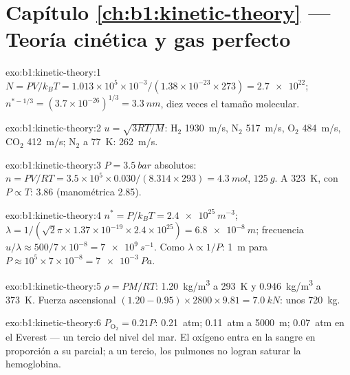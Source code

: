 \section*{Capítulo \ref{ch:b1:kinetic-theory} --- Teoría cinética y gas perfecto}

\begin{solution}{exo:b1:kinetic-theory:1}
$N = PV/k_BT = 1.013\times10^5 \times 10^{-3}/(1.38\times10^{-23} \times 273) =
\num{2.7e22}$; $n^{*-1/3} = (3.7\times10^{-26})^{1/3} = \qty{3.3}{nm}$, diez
veces el tamaño molecular.
\end{solution}

\begin{solution}{exo:b1:kinetic-theory:2}
$u = \sqrt{3RT/M}$: H$_2$ \qty{1930}{m/s}, N$_2$ \qty{517}{m/s}, O$_2$
\qty{484}{m/s}, CO$_2$ \qty{412}{m/s}; N$_2$ a \qty{77}{K}: \qty{262}{m/s}.
\end{solution}

\begin{solution}{exo:b1:kinetic-theory:3}
$P = \qty{3.5}{bar}$ absolutos: $n = PV/RT = 3.5\times10^5 \times 0.030/(8.314
\times 293) = \qty{4.3}{mol}$, $\qty{125}{g}$. A \qty{323}{K}, con $P \propto T$:
\qty{3.86}{} (manométrica \qty{2.85}{}).
\end{solution}

\begin{solution}{exo:b1:kinetic-theory:4}
$n^* = P/k_BT = \qty{2.4e25}{m^{-3}}$; $\lambda = 1/(\sqrt2\pi \times 1.37\times
10^{-19} \times 2.4\times10^{25}) = \qty{6.8e-8}{m}$; frecuencia $u/\lambda \approx
500/7\times10^{-8} = \qty{7e9}{s^{-1}}$. Como $\lambda \propto 1/P$: \qty{1}{m} para
$P \approx 10^5 \times 7\times10^{-8} = \qty{7e-3}{Pa}$.
\end{solution}

\begin{solution}{exo:b1:kinetic-theory:5}
$\rho = PM/RT$: \qty{1.20}{kg/m^3} a \qty{293}{K} y \qty{0.946}{kg/m^3} a
\qty{373}{K}. Fuerza ascensional $(1.20 - 0.95) \times 2800 \times 9.81 = \qty{7.0}{kN}$:
unos \qty{720}{kg}.
\end{solution}

\begin{solution}{exo:b1:kinetic-theory:6}
$P_{\mathrm{O}_2} = 0.21P$: \qty{0.21}{atm}; \qty{0.11}{atm} a \qty{5000}{m};
\qty{0.07}{atm} en el Everest --- un tercio del nivel del mar. El oxígeno
entra en la sangre en proporción a su  parcial; a un tercio, los
pulmones no logran saturar la hemoglobina.
\end{solution}

